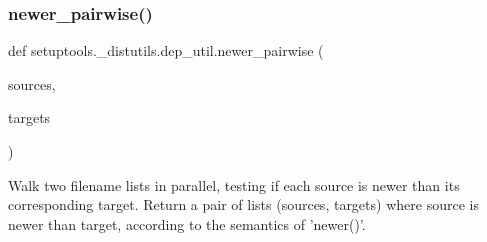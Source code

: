 \subsubsection{\texorpdfstring{newer\+\_\+pairwise()}{newer\_pairwise()}}
{\footnotesize\ttfamily def setuptools.\+\_\+distutils.\+dep\+\_\+util.\+newer\+\_\+pairwise (\begin{DoxyParamCaption}\item[{}]{sources,  }\item[{}]{targets }\end{DoxyParamCaption})}

\begin{DoxyVerb}Walk two filename lists in parallel, testing if each source is newer
than its corresponding target.  Return a pair of lists (sources,
targets) where source is newer than target, according to the semantics
of 'newer()'.
\end{DoxyVerb}
 